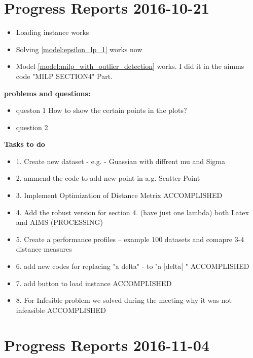 \documentclass[]{article}
\begin{document}
\newpage 
\section{Progress Reports 2016-10-21}




\begin{itemize}
\item Loading instance works

\item Solving  \eqref{model:epsilon_lp_1} works now

\item Model \eqref{model:milp_with_outlier_detection}
works. I did it in the aimms code "MILP SECTION4" Part.

\end{itemize}
{\bf problems and questions:}
\begin{itemize}
\item queston 1 How to show the certain points in the plots?
\item question 2

\end{itemize}

{\bf Tasks to do }

\begin{itemize}
\item 1. Create new dataset - e.g.  - Guassian with diffrent mu and Sigma
\item 2. ammend the code to add new point in a.g. Scatter Point
\item 3. Implement Optimization of Distance Metrix                 ACCOMPLISHED
\item 4. Add the robust version for section 4. (have just one lambda) both Latex and AIMS (PROCESSING)
\item 5. Create a performance profiles -- example 100 datasets and comapre 3-4 distance measures 
\item 6. add new codes for replacing "a delta"  - to  "a |delta| "           ACCOMPLISHED
\item 7. add button to load instance          ACCOMPLISHED
\item 8. For Infesible problem we solved during the meeting why it was not infeasible                  ACCOMPLISHED

\end{itemize}

\newpage
\section{Progress Reports 2016-11-04}
\end{document}
